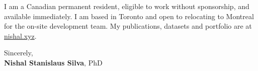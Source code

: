\documentclass[11pt]{article}
\newcommand{\clName}{Nishal Stanislaus Silva}
\newcommand{\clSite}{https://nishal.xyz}
\begin{document}
I am a Canadian permanent resident, eligible to work without sponsorship, and available immediately. I am based in Toronto and open to relocating to Montreal for the on-site development team. My publications, datasets and portfolio are at \href{\clSite}{nishal.xyz}.

\vspace{10pt}
Sincerely,\\[2pt]
\textbf{\clName}, PhD
\end{document}
